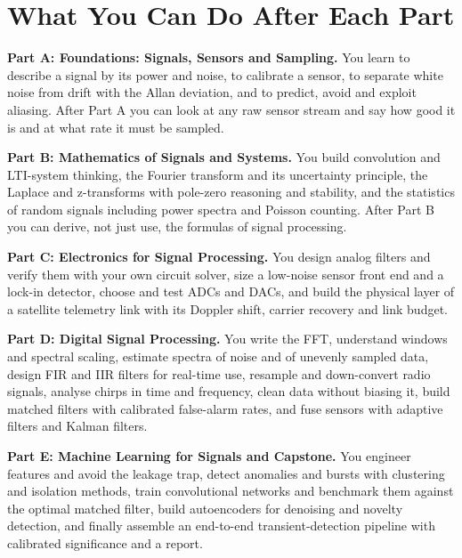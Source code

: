 \documentclass[11pt,a4paper,landscape]{article}
\begin{document}
\section*{What You Can Do After Each Part}
\textbf{Part A: Foundations: Signals, Sensors and Sampling.} You learn to describe a signal by its power and noise, to calibrate a sensor, to separate white noise from drift with the Allan deviation, and to predict, avoid and exploit aliasing. After Part A you can look at any raw sensor stream and say how good it is and at what rate it must be sampled.\par\smallskip
\textbf{Part B: Mathematics of Signals and Systems.} You build convolution and LTI-system thinking, the Fourier transform and its uncertainty principle, the Laplace and z-transforms with pole-zero reasoning and stability, and the statistics of random signals including power spectra and Poisson counting. After Part B you can derive, not just use, the formulas of signal processing.\par\smallskip
\textbf{Part C: Electronics for Signal Processing.} You design analog filters and verify them with your own circuit solver, size a low-noise sensor front end and a lock-in detector, choose and test ADCs and DACs, and build the physical layer of a satellite telemetry link with its Doppler shift, carrier recovery and link budget.\par\smallskip
\textbf{Part D: Digital Signal Processing.} You write the FFT, understand windows and spectral scaling, estimate spectra of noise and of unevenly sampled data, design FIR and IIR filters for real-time use, resample and down-convert radio signals, analyse chirps in time and frequency, clean data without biasing it, build matched filters with calibrated false-alarm rates, and fuse sensors with adaptive filters and Kalman filters.\par\smallskip
\textbf{Part E: Machine Learning for Signals and Capstone.} You engineer features and avoid the leakage trap, detect anomalies and bursts with clustering and isolation methods, train convolutional networks and benchmark them against the optimal matched filter, build autoencoders for denoising and novelty detection, and finally assemble an end-to-end transient-detection pipeline with calibrated significance and a report.\par\smallskip
\end{document}
